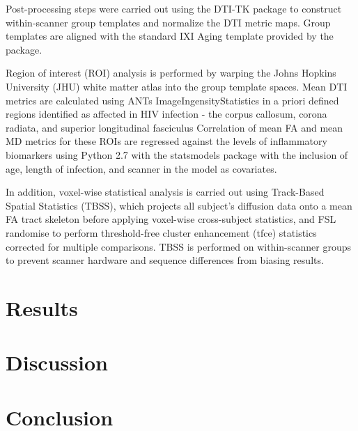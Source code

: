 \documentclass{article}
\begin{document}
Post-processing steps were carried out using the DTI-TK package to construct within-scanner group templates and normalize the DTI metric maps. Group templates are aligned %
with the standard IXI Aging template provided by the package.

Region of interest (ROI) analysis is performed by warping the Johns Hopkins University (JHU) white matter atlas into the group template spaces. Mean DTI metrics are calculated using ANTs ImageIngensityStatistics in a priori defined regions identified as affected in HIV infection - the corpus callosum, corona radiata, and superior longitudinal fasciculus %
Correlation of mean FA and mean MD metrics for these ROIs are regressed against the levels of inflammatory biomarkers using Python 2.7 with the statsmodels package with the inclusion of age, length of infection, and scanner in the model as covariates. %

In addition, voxel-wise statistical analysis is carried out using Track-Based Spatial Statistics (TBSS), which projects all subject's diffusion data onto a mean FA tract skeleton before applying voxel-wise cross-subject statistics, and FSL randomise to perform threshold-free cluster enhancement (tfce) statistics corrected for multiple comparisons.\cite{Smith2006Tract-basedData,Smith2004AdvancesFSL} TBSS is performed on within-scanner groups to prevent scanner hardware and sequence differences from biasing results.

\section{Results}



\section{Discussion}



\section{Conclusion}


 
 
\end{document}
